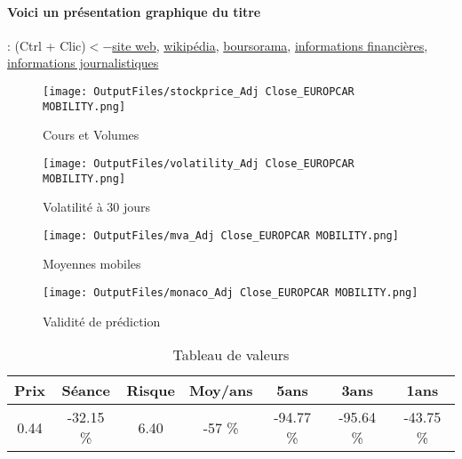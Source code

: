 \documentclass[11pt,a4paper]{report}%
\begin{document}
\paragraph{Voici un présentation graphique du titre} : (Ctrl + Clic)$<-$\href{https://europcar-mobility-group.com/}{site web}, \href{https://fr.wikipedia.org/wiki/Europcar_Mobility_Group}{wikipédia}, \href{https://www.boursorama.com/cours/1rPEUCAR}{boursorama}, \href{https://www.qwant.com/?q=site:https:%2f%2fwww.easybourse.com%2faction-societe%2fEUROPCAR-MOBILITY&t=web&client=ext-firefox-hp}{informations financières}, \href{https://bourse.lerevenu.com/cours-de-bourse/fiche-valeur-synthese/EUROPCAR-MOBILITY/EUCAR-FR}{informations journalistiques}
\begin{figure}[!htb]
   \begin{minipage}{0.5\textwidth}
     \centering
     \texttt{[image: OutputFiles/stockprice\_Adj Close\_EUROPCAR MOBILITY.png]}
     \caption{Cours et Volumes}\label{Fig:price_EUROPCAR MOBILITY}
   \end{minipage}\hfill
   \begin{minipage}{0.5\textwidth}
     \centering
     \texttt{[image: OutputFiles/volatility\_Adj Close\_EUROPCAR MOBILITY.png]}
     \caption{Volatilité à 30 jours}\label{Fig:volat_EUROPCAR MOBILITY}
   \end{minipage}
\end{figure}
\begin{figure}[!htb]
   \begin{minipage}{0.5\textwidth}
     \centering
     \texttt{[image: OutputFiles/mva\_Adj Close\_EUROPCAR MOBILITY.png]}
     \caption{Moyennes mobiles}\label{Fig:mva_EUROPCAR MOBILITY}
   \end{minipage}\hfill
   \begin{minipage}{0.5\textwidth}
     \centering
     \texttt{[image: OutputFiles/monaco\_Adj Close\_EUROPCAR MOBILITY.png]}
     \caption{Validité de prédiction}\label{Fig:prediction_EUROPCAR MOBILITY}
   \end{minipage}
\end{figure}

\begin{table}[H]
  \centering
    \begin{tabular}{|c|c|c|c|c|c|c|}
    \hline
    Prix & Séance & Risque  & Moy/ans & 5ans & 3ans & 1ans \\
    \hline
    0.44 &    -32.15 \%    & 6.40 & -57 \% & -94.77 \% & -95.64 \% & -43.75 \% \\
    \hline
    \end{tabular}%
        \label{tab:table_EUROPCAR MOBILITY}%
      \caption{Tableau de valeurs}
\end{table}%
\end{document}
